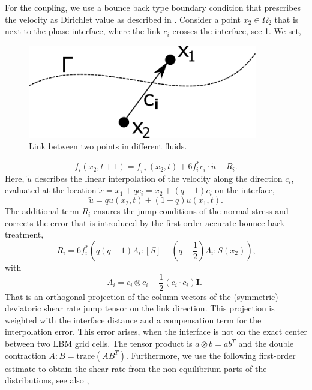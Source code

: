 \documentclass[final,leqno,onefignum,onetabnum]{siamltexmm}
\begin{document}
For the coupling, we use a bounce back type boundary condition that prescribes the velocity as Dirichlet value as described in \cite[p. 1146]{Thoemmes}. Consider a point $x_2 \in \Omega_2$ that is next to the phase interface, where the link $c_i$ crosses the interface, see \cref{coupling}. We set,
\begin{figure}
	\hfill\includegraphics[width=10cm,natwidth=437,natheight=178]{coupling.png}\hspace*{\fill}
	\caption{Link between two points in different fluids.}
	\label{coupling}
\end{figure}
\begin{equation}
	f_i(x_2,t+1) = f_{i*}^+(x_2,t) + 6f_i^*c_i \cdot \tilde{u} + R_i \text{.}
\end{equation}
Here, $\tilde{u}$ describes the linear interpolation of the velocity along the direction $c_i$, evaluated at the location $\tilde{x} = x_1 + qc_i = x_2 + (q-1)c_i$ on the interface,
$$
\tilde{u} = qu(x_2,t) + (1-q)u(x_1,t) \text{.}
$$
The additional term $R_i$ ensures the jump conditions of the normal stress and corrects the error that is introduced by the first order accurate bounce back treatment,
\begin{equation}
  R_i = 6f_i^* \left(q(q-1)\Lambda_i:[S] - (q-\frac12)\Lambda_i:S(x_2) \right) \text{,}
  \label{R_i}
\end{equation}
with
\begin{equation}
  \Lambda_i = c_i \otimes c_i - \frac12 (c_i \cdot c_i) \mathbf{I} \text{. }
\end{equation}
That is an orthogonal projection of the column vectors of the (symmetric) deviatoric shear rate jump tensor on the link direction. This projection is weighted with the interface distance and a compensation term for the interpolation error. This error arises, when the interface is not on the exact center between two LBM grid cells. The tensor product is $a \otimes b = ab^T$ and the double contraction $A:B = \mathrm{trace}(AB^T)$. Furthermore, we use the following first-order estimate to obtain the shear rate from the non-equilibrium parts of the distributions, see also \cite{Krueger},
\end{document}
